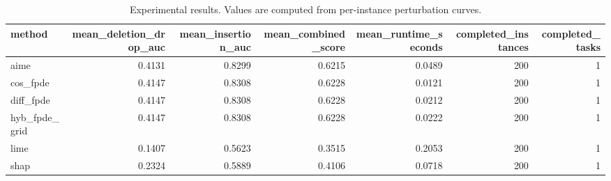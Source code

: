 \begin{table}[t]
\caption{Experimental results. Values are computed from per-instance perturbation curves.}
\label{tab:main_results_computed}
\centering
\begin{tabular}{lrrrrrr}
\toprule
method & mean\_deletion\_drop\_auc & mean\_insertion\_auc & mean\_combined\_score & mean\_runtime\_seconds & completed\_instances & completed\_tasks \\
\midrule
aime & 0.4131 & 0.8299 & 0.6215 & 0.0489 & 200 & 1 \\
cos\_fpde & 0.4147 & 0.8308 & 0.6228 & 0.0121 & 200 & 1 \\
diff\_fpde & 0.4147 & 0.8308 & 0.6228 & 0.0212 & 200 & 1 \\
hyb\_fpde\_grid & 0.4147 & 0.8308 & 0.6228 & 0.0222 & 200 & 1 \\
lime & 0.1407 & 0.5623 & 0.3515 & 0.2053 & 200 & 1 \\
shap & 0.2324 & 0.5889 & 0.4106 & 0.0718 & 200 & 1 \\
\bottomrule
\end{tabular}

\end{table}
